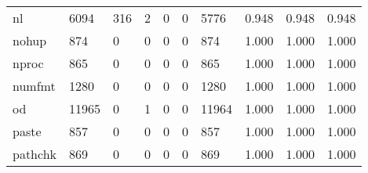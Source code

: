 \begin{longtable}{lp{1.3cm}p{1.3cm}p{1.3cm}p{1.3cm}p{1.3cm}p{1.3cm}p{1.3cm}p{1.3cm}p{1.3cm}}
nl        &                   6094 &                                316 &                                 2 &                                0 &                                 0 &                            5776 &                                   0.948 &                                  0.948 &                                0.948 \\
nohup     &                    874 &                                  0 &                                 0 &                                0 &                                 0 &                             874 &                                   1.000 &                                  1.000 &                                1.000 \\
nproc     &                    865 &                                  0 &                                 0 &                                0 &                                 0 &                             865 &                                   1.000 &                                  1.000 &                                1.000 \\
numfmt    &                   1280 &                                  0 &                                 0 &                                0 &                                 0 &                            1280 &                                   1.000 &                                  1.000 &                                1.000 \\
od        &                  11965 &                                  0 &                                 1 &                                0 &                                 0 &                           11964 &                                   1.000 &                                  1.000 &                                1.000 \\
paste     &                    857 &                                  0 &                                 0 &                                0 &                                 0 &                             857 &                                   1.000 &                                  1.000 &                                1.000 \\
pathchk   &                    869 &                                  0 &                                 0 &                                0 &                                 0 &                             869 &                                   1.000 &                                  1.000 &                                1.000 \\

\end{longtable}
